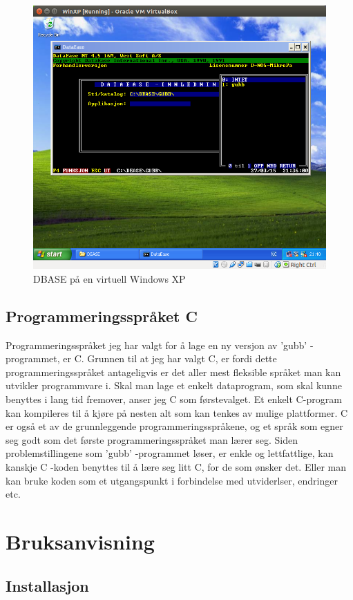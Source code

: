 \documentclass[12pt]{book}
\begin{document}
\begin{figure}
\centering
\includegraphics[width=12.0cm]{bilde_a}
\caption{DBASE på en virtuell Windows XP}
\end{figure}

\section{Programmeringsspråket C}

Programmeringsspråket jeg har valgt for å lage en ny versjon av 'gubb' -programmet, er C. Grunnen til at jeg har valgt C, er fordi 
dette programmeringsspråket antageligvis er det aller mest fleksible språket man kan utvikler programmvare i. Skal man lage et enkelt dataprogram, som skal kunne 
benyttes i lang tid fremover, anser jeg C som førstevalget. Et enkelt C-program kan kompileres til å kjøre på nesten alt som 
kan tenkes av mulige plattformer. C er også et av de grunnleggende programmeringsspråkene, og et språk som egner seg godt som det første 
programmeringsspråket man lærer seg. Siden problemstillingene som 'gubb' -programmet løser, er enkle og lettfattlige, kan kanskje C -koden benyttes til å lære seg litt C, for de som ønsker det. Eller man kan bruke koden som et utgangspunkt i forbindelse med utviderlser, endringer etc.

\chapter{Bruksanvisning}

\section{Installasjon}
\end{document}
